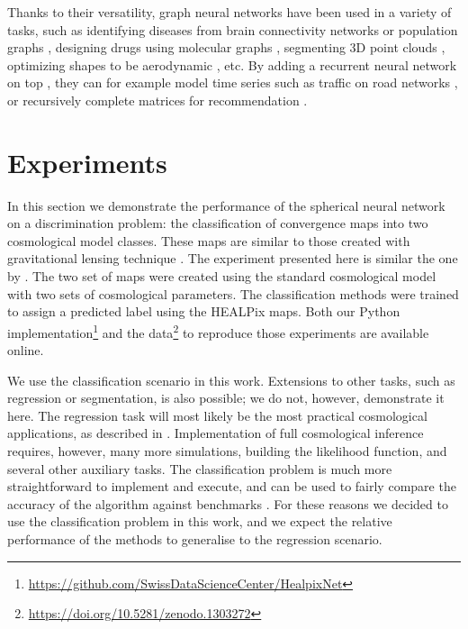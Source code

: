 \documentclass[final,twocolumn,3p,times,authoryear]{elsarticle}
\newcommand{\1}{\b{1}}              %
\newcommand{\0}{\b{0}}              %
\begin{document}

Thanks to their versatility, graph neural networks have been used in a variety of tasks, such as identifying diseases from brain connectivity networks \citep{ktena2018metriclearning} or population graphs \citep{parisot2017disease}, designing drugs using molecular graphs \citep{hop2018drugdesign},
segmenting 3D point clouds \citep{qi2017pointcloudsegmentation}, optimizing shapes to be aerodynamic \citep{baque2018shape}, etc.
By adding a recurrent neural network on top \citep{seo2016gcrn}, they can for example model time series such as traffic on road networks \citep{li2018traffic}, or recursively complete matrices for recommendation \citep{monti2017recommendation}.

\section{Experiments}
\label{sec:experiments}

In this section we demonstrate the performance of the spherical neural network on a discrimination problem: the classification of convergence maps into two cosmological model classes.
These maps are similar to those created with gravitational lensing technique \citep{chang2017curvedsky}.
The experiment presented here is similar the one by \citet{schmelze2017cosmologicalmodel}.
The two set of maps were created using the standard cosmological model with two sets of cosmological parameters.
The classification methods were trained to assign a predicted label using the HEALPix maps.
Both our Python implementation\footnote{\url{https://github.com/SwissDataScienceCenter/HealpixNet}} and the data\footnote{\url{https://doi.org/10.5281/zenodo.1303272}} to reproduce those experiments are available online.

We use the classification scenario in this work.
Extensions to other tasks, such as regression or segmentation, is also possible; we do not, however, demonstrate it here.
The regression task will most likely be the most practical cosmological applications, as described in \citep{gupta2018nongaussianinformation,fluri2018deep}.
Implementation of full cosmological inference requires, however, many more simulations, building the likelihood function, and several other auxiliary tasks.
The classification problem is much more straightforward to implement and execute, and can be used to fairly compare the accuracy of the algorithm against benchmarks \citep{schmelze2017cosmologicalmodel}.
For these reasons we decided to use the classification problem in this work, and we expect the relative performance of the methods to generalise to the regression scenario.
\end{document}
